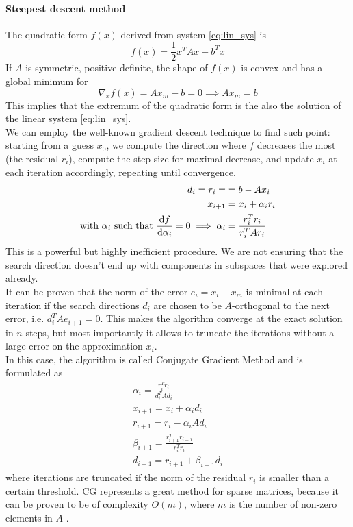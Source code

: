 \paragraph{Steepest descent method}
The quadratic form $f(x)$ derived from system \eqref{eq:lin_sys} is
\begin{equation}
    \label{eq:quad_form}
    f(x) = \frac 1 2 x^T A x - b^T x
\end{equation}
If $A$ is symmetric, positive-definite, the shape of $f(x)$ is convex and has a global minimum for
\begin{equation}
    \label{eq:quad_form_min}
    \nabla_x f(x) = A x_m - b = 0 \implies A x_m = b
\end{equation}
This implies that the extremum of the quadratic form is the also the solution of the linear system \eqref{eq:lin_sys}.
\\We can employ the well-known gradient descent technique \cite{PainlessCGM} to find such point: starting from a guess $x_0$, we compute the direction where $f$ decreases the most (the residual $r_i$), compute the step size for maximal decrease, and update $x_i$ at each iteration accordingly, repeating until convergence.
\begin{align}
d_i = r_i =&= b - A x_i \\
x_{i+1} &= x_i +\alpha_i r_i \\
\text{with } \alpha_i \text{ such that } \dv{f}{\alpha_i} = 0 \implies \alpha_i &= \frac{r_i^T r_i}{r_i^T A r_i}
\end{align}
This is a powerful but highly inefficient procedure. We are not ensuring that the search direction doesn't end up with components in subspaces that were explored already.
\\It can be proven \cite{PainlessCGM} that the norm of the error $e_i = x_i - x_m$ is minimal at each iteration if the search directions $d_i$ are chosen to be $A$-orthogonal to the next error, i.e. $d_i^T A e_{i+1} = 0$. This makes the algorithm converge at the exact solution in $n$ steps, but most importantly it allows to truncate the iterations without a large error on the approximation $x_i$.
\\In this case, the algorithm is called Conjugate Gradient Method and is formulated as 
\begin{align}
    \label{eq:cg_method}
    \alpha_i = \frac{r_i^T r_i}{d_i^T A d_i}  
    \\x_{i+1} = x_i + \alpha_i d_i
    \\r_{i+1} = r_i - \alpha_i A d_i
    \\\beta_{i+1} = \frac{r_{i+1}^T r_{i+1}}{r_i^T r_i}
    \\d_{i+1} = r_{i+1} + \beta_{i+1} d_i
\end{align}
where iterations are truncated if the norm of the residual $r_i$ is smaller than a certain threshold.
CG represents a great method for sparse matrices, because it can be proven to be of complexity $O(m)$, where $m$ is the number of non-zero elements in $A$ \cite{PainlessCGM}.
